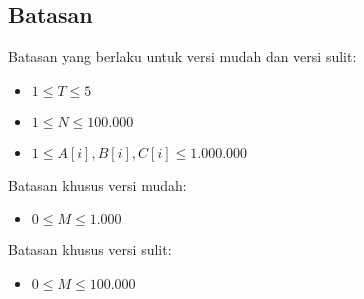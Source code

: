 \documentclass[../main_problemset.tex]{subfiles} %
\begin{document}
\subsection*{Batasan}

Batasan yang berlaku untuk versi mudah dan versi sulit:

\begin{itemize}
	\item $ 1 \le T \le 5 $
	\item $ 1 \le N \le 100.000 $
	\item $ 1 \le A[i], B[i], C[i] \le 1.000.000 $
\end{itemize}

Batasan khusus versi mudah:

\begin{itemize}
	\item $0 \le M \le 1.000$
\end{itemize}

Batasan khusus versi sulit:

\begin{itemize}
	\item $0 \le M \le 100.000$
\end{itemize}
\end{document}
